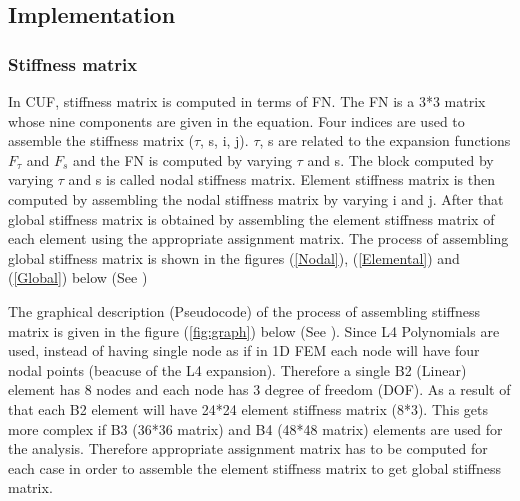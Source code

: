 \documentclass[a4paper,12pt]{article}
\begin{document}
\subsection*{Implementation}
\subsubsection*{Stiffness matrix}
\indent\indent In CUF, stiffness matrix is computed in terms of FN. The FN is a 3*3 matrix whose nine components are given in the equation. Four indices are used to assemble the stiffness matrix ($\tau$, s, i, j). $\tau$, s are related to the expansion functions $F_{\tau}$ and $F_{s}$ and the FN is computed by varying $\tau$ and s. The block computed by varying $\tau$ and s is called nodal stiffness matrix. Element stiffness matrix is then computed by assembling the nodal stiffness matrix by varying i and j. After that global stiffness matrix is obtained by assembling the element stiffness matrix of each element using the appropriate assignment matrix. The process of assembling global stiffness matrix is shown in the figures   (\ref{Nodal}), (\ref{Elemental}) and (\ref{Global})  below (See \cite{carrera2014finite}) 

\indent\indent The graphical description (Pseudocode) of the process of assembling stiffness matrix is given in the figure (\ref{fig:graph}) below (See \cite{carrera2014finite}). Since L4 Polynomials are used, instead of having single node as if in 1D FEM each node will have four nodal points (beacuse of the L4 expansion). Therefore a single B2 (Linear) element has 8 nodes and each node has 3 degree of freedom (DOF). As a result of that each B2 element will have 24*24 element stiffness matrix (8*3). This gets more complex if B3 (36*36 matrix) and B4 (48*48 matrix) elements are used for the analysis. Therefore appropriate assignment matrix has to be computed for each case in order to assemble the element stiffness matrix to get global stiffness matrix.
\end{document}
